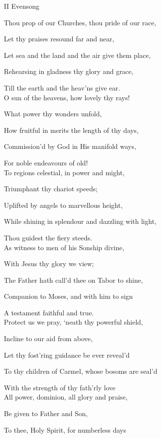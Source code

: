 \begin{inhead}
	II Evensong
\end{inhead}

Thou prop of our Churches, thou pride of our race,

Let thy praises resound far and near,

Let sea and the land and the air give them place,

Rehearsing in gladness thy glory and grace,

Till the earth and the heav'ns give ear.\\

O sun of the heavens, how lovely thy rays!

What power thy wonders unfold,

How fruitful in merits the length of thy days,

Commission'd by God in His manifold ways,

For noble endeavours of old!\\

To regions celestial, in power and might,

Triumphant thy chariot speeds;

Uplifted by angels to marvellous height,

While shining in splendour and dazzling with light,

Thou guidest the fiery steeds.\\

As witness to men of his Sonship divine,

With Jesus thy glory we view;

The Father hath call'd thee on Tabor to shine,

Companion to Moses, and with him to sign

A testament faithful and true.\\

Protect us we pray, ‘neath thy powerful shield,

Incline to our aid from above,

Let thy fost'ring guidance be ever reveal'd

To thy children of Carmel, whose bosoms are seal'd

With the strength of thy fath'rly love\\

All power, dominion, all glory and praise,

Be given to Father and Son,

To thee, Holy Spirit, for numberless days

